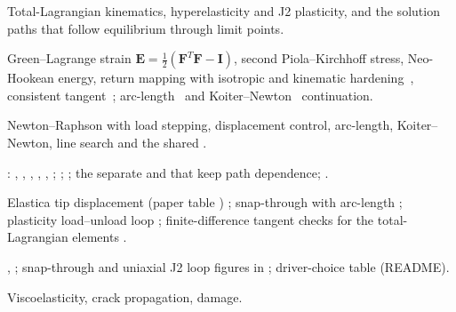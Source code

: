 \begin{description}[style=nextline,leftmargin=1em]
\item[Focus] Total-Lagrangian kinematics, hyperelasticity and J2 plasticity, and the solution paths that follow equilibrium through limit points.
\item[Mathematics] Green--Lagrange strain $\bm E=\tfrac12(\bm F^T\bm F-\bm I)$, second Piola--Kirchhoff stress, Neo-Hookean energy, return mapping with isotropic and kinematic hardening~\cite{simo1998inelasticity}, consistent tangent~\cite{simo1985tangent}; arc-length~\cite{riks1979,crisfield1981} and Koiter--Newton~\cite{liang2014koiternewton} continuation.
\item[Algorithm] Newton--Raphson with load stepping, displacement control, arc-length, Koiter--Newton, line search and the shared .
\item[Implementation] : , , , , , ; ; ; the separate  and  that keep path dependence; .
\item[Verification] Elastica tip displacement (paper table ) \have{}; snap-through with arc-length \have{}; plasticity load--unload loop \have{}; finite-difference tangent checks for the total-Lagrangian elements \have{}.
\item[Figures and tables] , ; snap-through and uniaxial J2 loop figures in  \have{}; driver-choice table \have{} (README).
\item[Exclusions] Viscoelasticity, crack propagation, damage.
\end{description}


